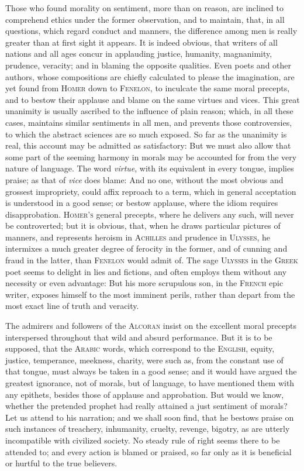 Those who found morality on sentiment, more than on reason, are
inclined to comprehend ethics under the former observation, and to
maintain, that, in all questions, which regard conduct and manners,
the difference among men is really greater than at first sight it
appears. It is indeed  obvious, that writers of all nations
and all ages concur in applauding justice, humanity, magnanimity,
prudence, veracity; and in blaming the opposite qualities. Even poets
and other authors, whose compositions are chiefly calculated to please
the imagination, are yet found from \textsc{Homer} down to
\textsc{Fenelon}, to inculcate the same moral precepts, and to bestow
their applause and blame on the same virtues and vices. This great
unanimity is usually ascribed to the influence of plain reason; which,
in all these cases, maintains similar sentiments in all men, and
prevents those controversies, to which the abstract sciences are so
much exposed. So far as the unanimity is real, this account may be
admitted as satisfactory: But we must also allow that some part of the
seeming harmony in morals may be accounted for from the very nature of
language. The word \textit{virtue}, with its equivalent in every
tongue, implies praise; as that of \textit{vice} does blame: And no
one, without the most obvious and grossest impropriety, could affix
reproach to a term, which in general acceptation is understood in a
good sense; or bestow applause, where the idiom requires
disapprobation. \textsc{Homer's} general precepts, where he delivers
any such, will never be controverted; but it is obvious, that, when he
draws particular pictures of manners, and represents heroism in
\textsc{Achilles} and prudence in \textsc{Ulysses}, he intermixes a
much greater degree of ferocity in the former, and of cunning and
fraud in the latter, than \textsc{Fenelon} would admit of. The sage
\textsc{Ulysses} in the \textsc{Greek} poet seems to delight in lies
and fictions, and often employs them without any necessity or even
advantage: But his more scrupulous son, in the \textsc{French} epic
writer, exposes himself to the most imminent perils, rather than
depart from the most exact line of truth and veracity.

The admirers and followers of the \textsc{Alcoran} insist on the
excellent moral precepts interspersed throughout that wild and absurd
performance. But it is to be supposed, that the \textsc{Arabic} words,
which correspond to the \textsc{English}, equity, justice, temperance,
meekness, charity, were such as, from the constant use of that tongue,
must always be taken in a good sense; and it would have argued the
greatest ignorance, not of morals, but of language, to have mentioned
them with any epithets, besides those of applause and approbation. But
would we know, whether the pretended prophet had really attained a
just sentiment of morals? Let us attend to his  narration;
and we shall soon find, that he bestows praise on such instances of
treachery, inhumanity, cruelty, revenge, bigotry, as are utterly
incompatible with civilized society. No steady rule of right seems
there to be attended to; and every action is blamed or praised, so far
only as it is beneficial or hurtful to the true believers.

